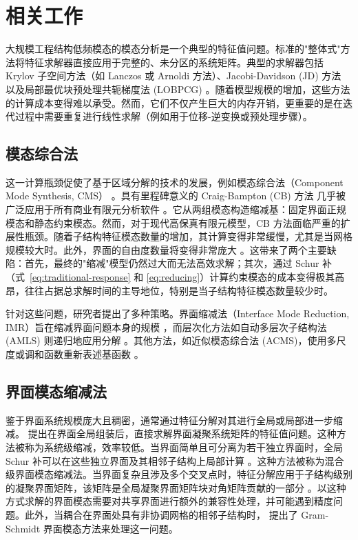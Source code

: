 \section{相关工作}

大规模工程结构低频模态的模态分析是一个典型的特征值问题。标准的"整体式"方法将特征求解器直接应用于完整的、未分区的系统矩阵。典型的求解器包括 Krylov 子空间方法（如 Lanczos 或 Arnoldi 方法）\cite{Hernandez2005SLEPc, Qiu2015Spectra}、Jacobi-Davidson (JD) 方法 \cite{Sleijpen2000JD} 以及局部最优块预处理共轭梯度法 (LOBPCG) \cite{knyazev2001lobpcg}。随着模型规模的增加，这些方法的计算成本变得难以承受。然而，它们不仅产生巨大的内存开销，更重要的是在迭代过程中需要重复进行线性求解（例如用于位移-逆变换或预处理步骤）。

\subsection{模态综合法}

这一计算瓶颈促使了基于区域分解的技术的发展，例如模态综合法（Component Mode Synthesis, CMS） \cite{seshu1997substructuring, William1985CMS, bourquin1992component}。具有里程碑意义的 Craig-Bampton (CB) 方法 \cite{craig1968coupling} 几乎被广泛应用于所有商业有限元分析软件 \cite{Vysok2017CurrentCO}。它从两组模态构造缩减基：固定界面正规模态和静态约束模态。然而，对于现代高保真有限元模型，CB 方法面临严重的扩展性瓶颈。随着子结构特征模态数量的增加，其计算变得非常缓慢，尤其是当网格规模较大时。此外，界面的自由度数量将变得非常庞大 \cite{KRATTIGER2019Riview}。这带来了两个主要缺陷：首先，最终的"缩减"模型仍然过大而无法高效求解；其次，通过 Schur 补（式~\ref{eq:traditional-response} 和 \ref{eq:reducing}）计算约束模态的成本变得极其高昂，往往占据总求解时间的主导地位，特别是当子结构特征模态数量较少时。

针对这些问题，研究者提出了多种策略。界面缩减法（Interface Mode Reduction, IMR）旨在缩减界面问题本身的规模 \cite{Kuether2017InterfaceReduction}，而层次化方法如自动多层次子结构法 (AMLS) 则递归地应用分解 \cite{Bennighof2004AMLS, Boo2016ErrorEstimation, Papalukopoulos2006Dynamics}。其他方法，如近似模态综合法 (ACMS)，使用多尺度或调和函数重新表述基函数 \cite{hetmaniuk2010special, hetmaniuk2014error, Heinlein2015ACMS, Madureira2025SACMS, giammatteo2024extension}。

\subsection{界面模态缩减法}

鉴于界面系统规模庞大且稠密，通常通过特征分解对其进行全局或局部进一步缩减。
\citet{Castanier20101Characteristic} 提出在界面全局组装后，直接求解界面凝聚系统矩阵的特征值问题。这种方法被称为系统级缩减，效率较低。当界面简单且可分离为若干独立界面时，全局 Schur 补可以在这些独立界面及其相邻子结构上局部计算 \citep{Cheon2023Enhanced,KRATTIGER2019Riview}。这种方法被称为混合级界面模态缩减法。当界面复杂且涉及多个交叉点时，特征分解应用于子结构级别的凝聚界面矩阵，该矩阵是全局凝聚界面矩阵块对角矩阵贡献的一部分 \cite{HONG2013403, Kuether2017Model}。以这种方式求解的界面模态需要对共享界面进行额外的兼容性处理，并可能遇到精度问题。此外，当耦合在界面处具有非协调网格的相邻子结构时，\citet{BATTIATO2018187} 提出了 Gram-Schmidt 界面模态方法来处理这一问题。

